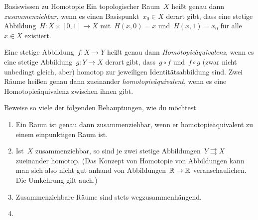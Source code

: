 \documentclass{uebblatt}
\begin{document}
\begin{aufgabe}{Basiswissen zu Homotopie}
Ein topologischer Raum~$X$ heißt genau dann \emph{zusammenziehbar}, wenn es
einen Basispunkt~$x_0 \in X$ derart gibt, dass eine stetige Abbildung~$H :
X \times [0,1] \to X$ mit~$H(x,0) = x$ und~$H(x,1) = x_0$ für alle~$x \in X$
existiert.

Eine stetige Abbildung~$f : X \to Y$ heißt genau dann
\emph{Homotopieäquivalenz}, wenn es eine stetige Abbildung~$g : Y \to X$ derart
gibt, dass~$g \circ f$ und~$f \circ g$ (zwar nicht unbedingt gleich, aber)
homotop zur jeweiligen Identitätsabbildung sind. Zwei Räume heißen genau dann
zueinander \emph{homotopieäquivalent}, wenn es eine Homotopieäquivalenz
zwischen ihnen gibt.

Beweise so viele der folgenden Behauptungen, wie du möchtest.

\begin{enumerate}
\item Ein Raum ist genau dann zusammenziehbar, wenn er homotopieäquivalent zu
einem einpunktigen Raum ist.
\item Ist~$X$ zusammenziehbar, so sind je zwei stetige Abbildungen~$Y
\rightrightarrows X$ zueinander homotop. (Das Konzept von Homotopie von
Abbildungen kann man sich also nicht gut anhand von Abbildungen~$\mathbb{R} \to \mathbb{R}$
veranschaulichen. Die Umkehrung gilt auch.)
\item Zusammenziehbare Räume sind stets wegzusammenhängend.
\item {}
\end{enumerate}
\end{aufgabe}
\end{document}
